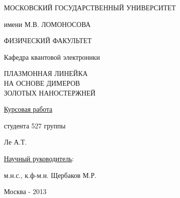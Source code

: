 \begin{titlepage}
\begin{center}
{\Large

МОСКОВСКИЙ ГОСУДАРСТВЕННЫЙ УНИВЕРСИТЕТ

имени М.В. ЛОМОНОСОВА

ФИЗИЧЕСКИЙ ФАКУЛЬТЕТ

Кафедра квантовой электроники

\vspace{5cm}

ПЛАЗМОННАЯ ЛИНЕЙКА \\
НА ОСНОВЕ ДИМЕРОВ \\
ЗОЛОТЫХ НАНОСТЕРЖНЕЙ

}
\end{center}


\vspace{4cm}
\begin{flushright}
\underline{Курсовая работа}

студента 527 группы

Ле А.Т.

\vspace{1cm}

\underline{Научный руководитель}:

м.н.с., к.ф-м.н. Щербаков М.Р.\\

\end{flushright}

\vspace{4cm}
\begin{centering}
Москва - 2013

\end{centering}
\end{titlepage}
